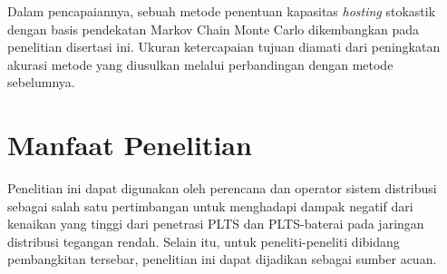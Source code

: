 Dalam pencapaiannya, sebuah metode penentuan kapasitas \textit{hosting} stokastik dengan basis pendekatan Markov Chain Monte Carlo dikembangkan pada penelitian disertasi ini. Ukuran ketercapaian tujuan diamati dari peningkatan akurasi metode yang diusulkan melalui perbandingan dengan metode sebelumnya. 



\section{Manfaat Penelitian}
Penelitian ini dapat digunakan oleh perencana dan operator sistem distribusi sebagai salah satu pertimbangan untuk menghadapi dampak negatif dari kenaikan yang tinggi dari penetrasi PLTS dan PLTS-baterai pada jaringan distribusi tegangan rendah. Selain itu, untuk peneliti-peneliti dibidang pembangkitan tersebar, penelitian ini dapat dijadikan sebagai sumber acuan. 



